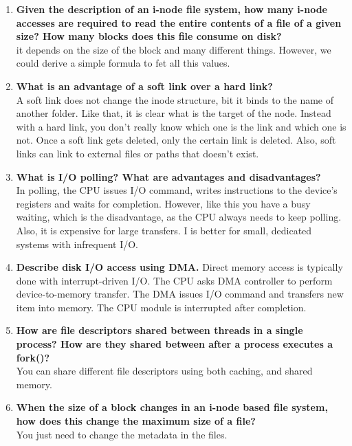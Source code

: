 \documentclass[a4paper]{article}
\begin{document}
\begin{enumerate}
  \item {\bf Given the description of an i-node file system, how many i-node accesses are required to read the entire contents of a file of a given size?  How many blocks does this file consume on disk? }\\
    it depends on the size of the block and many different things. However, we could derive a simple formula to fet all this values.

  \item {\bf What is an advantage of a soft link over a hard link?} \\
    A soft link does not change the inode structure, bit it binds to the name of another folder. Like that, it is clear what is the target of the node. Instead with a hard link, you don't really know which one is the link and which one is not. Once a soft link gets deleted, only the certain link is deleted. Also, soft links can link to external files or paths that doesn't exist.

  \item {\bf What is I/O polling?  What are advantages and disadvantages?} \\
    In polling, the CPU issues I/O command, writes instructions to the device's registers and waits for completion. However, like this you have a busy waiting, which is the disadvantage, as the CPU always needs to keep polling. Also, it is expensive for large transfers. I is better for small, dedicated systems with infrequent I/O.

  \item {\bf Describe disk I/O access using DMA.}
    Direct memory access is typically done with interrupt-driven I/O. The CPU asks DMA controller to perform device-to-memory transfer. The DMA issues I/O command and transfers new item into memory. The CPU module is interrupted after completion.

  \item {\bf How are file descriptors shared between threads in a single process?  How are they shared between after a process executes a fork()? } \\
    You can share different file descriptors using both caching, and shared memory. 
  
  \item {\bf When the size of a block changes in an i-node based file system, how does this change the maximum size of a file? }\\
    You just need to change the metadata in the files.


\end{enumerate}
\end{document}
